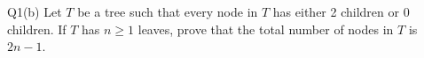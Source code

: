 \begin{problem}
  {Q1(b)}
  Let $T$ be a tree such that every node in $T$ has either 2 children or 0 children. If $T$ has $n \geq 1$ leaves, prove
  that the total number of nodes in $T$ is $2n-1$. \\
\end{problem}
